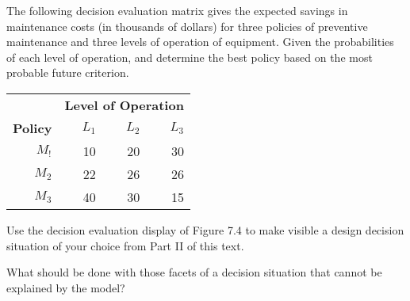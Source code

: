 \begin{exercises}
    \begin{exercise}
    \label{sea-07-43}
        The following decision evaluation matrix gives the expected savings in maintenance costs (in thousands of dollars) for three policies of preventive maintenance and three levels of operation of equipment. Given the probabilities of each level of operation,   and   determine the best policy based on the most probable future criterion.
        \begin{table}[h]
        \centering
        \begin{tabular}{r r r r}
        \toprule
         & \multicolumn{3}{c}{\textbf{Level of Operation}} \\
         \textbf{Policy} & \textbf{$L_1$} & \textbf{$L_2$} & \textbf{$L_3$} \\
        \midrule
        $M_!$ & 10 & 20 & 30 \\
        $M_2$ & 22 & 26 & 26 \\
        $M_3$ & 40 & 30 & 15 \\
        \bottomrule
        \end{tabular}
        \label{tab:sea-07-43} %
        \end{table}
    \end{exercise}
    \begin{solution}
    \end{solution}
    
    \begin{exercise}
    \label{sea-07-44}
        Use the decision evaluation display of Figure 7.4 to make visible a design decision situation of your choice from Part II of this text.
    \end{exercise}
    \begin{solution}
    \end{solution}
    
    \begin{exercise}
    \label{sea-07-45}
        What should be done with those facets of a decision situation that cannot be explained by the model?
    \end{exercise}
    \begin{solution}
    \end{solution}
\end{exercises}
